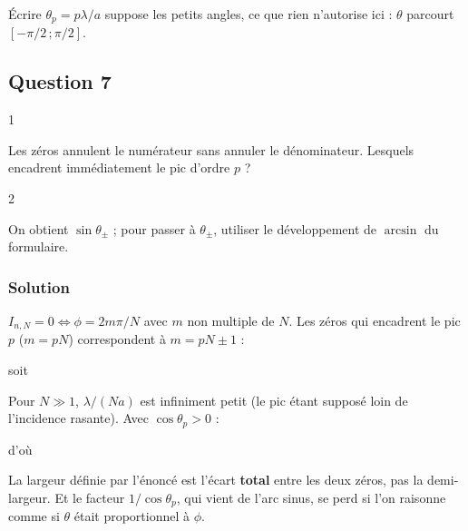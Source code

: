 \documentclass[11pt,a4paper]{article}
\newcommand{\equationajustee}[1]{%
  \sbox{\boiteequation}{$\displaystyle #1$}%
  \ifdim\wd\boiteequation>\linewidth
    \[\resizebox{\linewidth}{!}{\usebox{\boiteequation}}\]%
  \else
    \[#1\]%
  \fi}
\begin{document}
\begin{piege}

Écrire \(\theta_p = p\lambda/a\) suppose les petits angles, ce que rien n'autorise ici : \(\theta\) parcourt \([-\pi/2\,;\pi/2]\).

\end{piege}

\hypertarget{question-7}{%
\subsection{Question 7}\label{question-7}}

\begin{indication}{1}

Les zéros annulent le numérateur sans annuler le dénominateur. Lesquels encadrent immédiatement le pic d'ordre \(p\) ?

\end{indication}

\begin{indication}{2}

On obtient \(\sin\theta_\pm\) ; pour passer à \(\theta_\pm\), utiliser le développement de \(\arcsin\) du formulaire.

\end{indication}

\hypertarget{solution-6}{%
\subsubsection{Solution}\label{solution-6}}

\(I_{n,N} = 0\iff\phi = 2m\pi/N\) avec \(m\) non multiple de \(N\). Les zéros qui encadrent le pic \(p\) (\(m = pN\)) correspondent à \(m = pN\pm1\) :

\equationajustee{\phi_\pm = 2p\pi\pm\frac{2\pi}{N},}

soit

\equationajustee{\sin\theta_\pm = \sin\theta_p\pm\frac{\lambda}{Na}.}

Pour \(N\gg1\), \(\lambda/(Na)\) est infiniment petit (le pic étant supposé loin de l'incidence rasante). Avec \(\cos\theta_p>0\) :

\equationajustee{\theta_\pm\simeq\theta_p\pm\frac{\lambda}{Na\cos\theta_p},}

d'où

\equationajustee{\boxed{\delta\theta_p = \frac{2\lambda}{Na\cos\theta_p}}}

\begin{piege}

La largeur définie par l'énoncé est l'écart \textbf{total} entre les deux zéros, pas la demi-largeur. Et le facteur \(1/\cos\theta_p\), qui vient de l'arc sinus, se perd si l'on raisonne comme si \(\theta\) était proportionnel à \(\phi\).

\end{piege}
\end{document}
